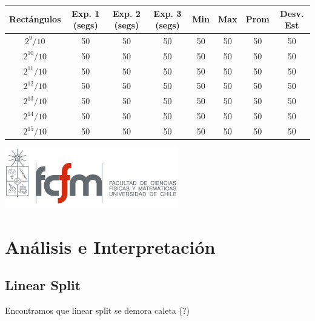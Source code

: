 \documentclass[letterpaper,10pt]{article}
\begin{document}
	\begin{center}

		\begin{tabular}{|c|c|c|c|c|c|c|c|}
			\hline
			Rectángulos	& Exp. 1 (segs) & Exp. 2 (segs) & Exp. 3 (segs) & Min & Max & Prom & Desv. Est\\
			\hline
			$2^{9}/10$ 	& 50 	& 50 	& 50 	& 50 	& 50 	& 50 	& 50 \\
			\hline
			$2^{10}/10$ 	& 50 	& 50 	& 50 	& 50 	& 50 	& 50 	& 50 \\
			\hline
			$2^{11}/10$ 	& 50 	& 50 	& 50 	& 50 	& 50 	& 50 	& 50 \\
			\hline
			$2^{12}/10$ 	& 50 	& 50 	& 50 	& 50 	& 50 	& 50 	& 50 \\
			\hline
			$2^{13}/10$ 	& 50 	& 50 	& 50 	& 50 	& 50 	& 50 	& 50 \\
			\hline
			$2^{14}/10$ 	& 50 	& 50 	& 50 	& 50 	& 50 	& 50 	& 50 \\
			\hline
			$2^{15}/10$ 	& 50 	& 50 	& 50 	& 50 	& 50 	& 50 	& 50 \\
			\hline
		\end{tabular}

		\includegraphics{logoFCFM.png}
	\end{center}

	\newpage

	\section{Análisis e Interpretación}

	\subsection{Linear Split}

	Encontramos que linear split se demora caleta (?)
\end{document}
